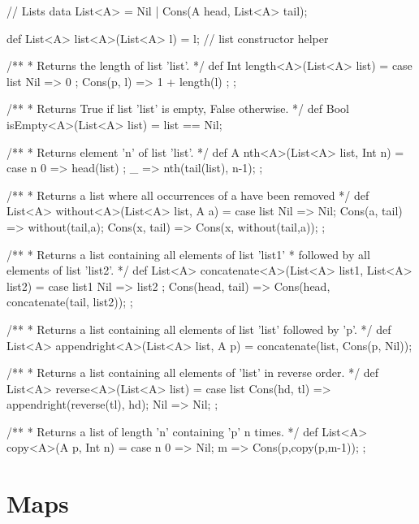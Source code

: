 \begin{abscode}
// Lists
data List<A> = Nil | Cons(A head, List<A> tail);

def List<A> list<A>(List<A> l) = l; // list constructor helper

/**
 * Returns the length of list 'list'.
 */
def Int length<A>(List<A> list) = 
   case list { 
      Nil => 0 ; 
      Cons(p, l) => 1 + length(l) ; 
   };

/**
 * Returns True if list 'list' is empty, False otherwise.
 */
def Bool isEmpty<A>(List<A> list) = list == Nil;

/**
 * Returns element 'n' of list 'list'.
 */
def A nth<A>(List<A> list, Int n) = 
  case n { 
    0 => head(list) ; 
    _ => nth(tail(list), n-1); 
  };
  
/**
 * Returns a list where all occurrences of a have been removed
 */
def List<A> without<A>(List<A> list, A a) =
  case list {
     Nil => Nil;
     Cons(a, tail) => without(tail,a);
     Cons(x, tail) => Cons(x, without(tail,a));
  };  
  
/**
 * Returns a list containing all elements of list 'list1'
 * followed by all elements of list 'list2'.
 */
def List<A> concatenate<A>(List<A> list1, List<A> list2) =
  case list1 { 
    Nil => list2 ; 
    Cons(head, tail) =>  Cons(head, concatenate(tail, list2)); 
  };
  
/**
 * Returns a list containing all elements of list 'list' followed by 'p'.
 */
def List<A> appendright<A>(List<A> list, A p) = 
    concatenate(list, Cons(p, Nil));

/**
 * Returns a list containing all elements of 'list' in reverse order.
 */
def List<A> reverse<A>(List<A> list) =
  case list { 
     Cons(hd, tl) => appendright(reverse(tl), hd); 
     Nil => Nil; 
  };
  
/**
 * Returns a list of length 'n' containing 'p' n times.
 */
def List<A> copy<A>(A p, Int n) = 
   case n { 0 => Nil; m => Cons(p,copy(p,m-1)); };
\end{abscode}

\section{Maps}

